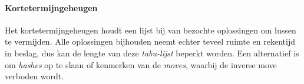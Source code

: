 \paragraph{Kortetermijngeheugen}
Het kortetermijngeheugen houdt een lijst bij van bezochte oplossingen om lussen te vermijden. 
Alle oplossingen bijhouden neemt echter teveel ruimte en rekentijd in beslag, dus kan de lengte van deze \emph{tabu-lijst} beperkt worden. 
Een alternatief is om \emph{hashes} op te slaan of kenmerken van de \emph{moves}, waarbij de inverse move verboden wordt.

